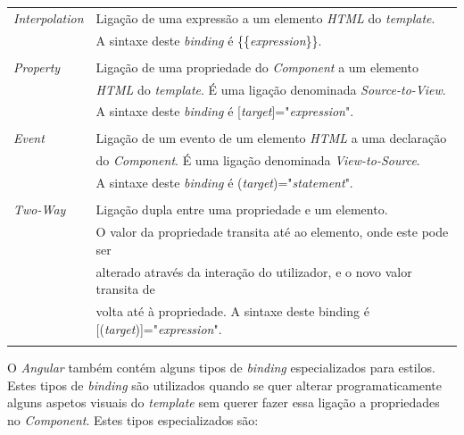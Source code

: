 \begin{tabular}{ll}
	\emph{Interpolation} & Ligação de uma expressão a um elemento \textit{HTML} do \textit{template}. \\
	& A sintaxe deste \textit{binding} é {\{\{\textit{expression}\}\}}. \\
	\\
	\emph{Property} & Ligação de uma propriedade do \textit{Component} a um elemento \\
	&\textit{HTML} do \textit{template}. É uma ligação denominada \textit{Source-to-View}. \\
	& A sintaxe deste \textit{binding} é [\textit{target}]="\textit{expression}".\\
	\\
	\emph{Event} & Ligação de um evento de um elemento \textit{HTML} a uma declaração \\
	&do \textit{Component}. É uma ligação denominada \textit{View-to-Source}.\\
	& A sintaxe deste \textit{binding} é (\textit{target})="\textit{statement}".\\
	\\
	\emph{Two-Way} & Ligação dupla entre uma propriedade e um elemento. \\
	& O valor da propriedade transita até ao elemento, onde este pode ser \\
	&alterado através da interação do utilizador, e o novo valor transita de \\
	&volta até à propriedade. A sintaxe deste binding é [(\textit{target})]="\textit{expression}".\\
	\\
\end{tabular}
O \textit{Angular} também contém alguns tipos de \textit{binding} especializados para estilos. Estes tipos de \textit{binding} são utilizados quando se quer alterar programaticamente alguns aspetos visuais do \textit{template} sem querer fazer essa ligação a propriedades no \textit{Component}. Estes tipos especializados são:\\

